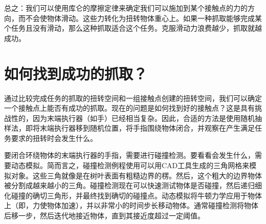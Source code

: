 总之：我们可以使用库仑的摩擦定律来确定我们可以施加到某个接触点的力的方向，而不会使物体滑动。这些力转化为扭转物体重心上。如果一种抓取能够完成某个任务且没有滑动，那么这种抓取适合这个任务。克服滑动力浪费越少，抓取就越成功。


\section{如何找到成功的抓取？}
通过比较完成任务的抓取的扭转空间和一组接触点创建的扭转空间，我们可以确定一个接触点上能否有成功的抓取。现在的问题是如何找到好的接触点？这是具有挑战性的，因为末端执行器（如手）已经相当复杂。因此，合适的方法是使用随机抽样法，即将末端执行器移到随机位置，将手指围绕物体闭合，并观察在产生满足任务要求的扭转时会发生什么。


要闭合环绕物体的末端执行器的手指，需要进行碰撞检测。要看看会发生什么，需要动态模拟。简而言之，碰撞检测例程使用可以用CAD工具生成的三角网格来模拟对象。这些三角就像是在树叶表面有粗糙边界的楞。然后，这个粗大的边界物体被分割成越来越小的三角。碰撞检测现在可以快速测试物体是否碰撞，然后递归细化碰撞的确切三角形，并最终找到确切的碰撞点。动态模拟将牛顿力学应用于物体上（即，力使物体加速），并以非常小的时间步长移动物体。通常碰撞检测将物体后移一步，然后迭代地接近物体，直到其接近度超过一定阈值。
